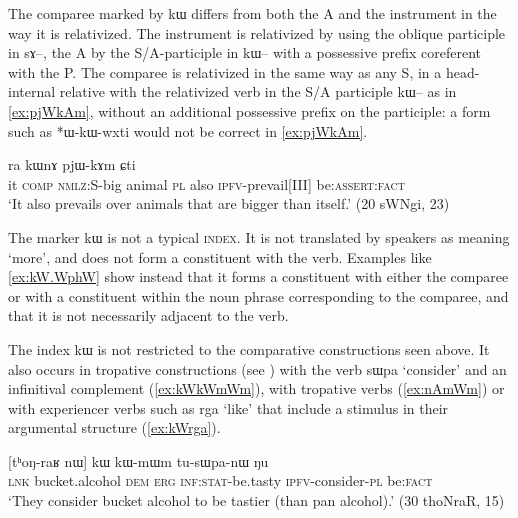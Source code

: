 \documentclass[oldfontcommands,oneside,a4paper,11pt]{article}
\newcommand{\ipa}[1]{{\phon #1}} %
\begin{document}
The comparee marked by \ipa{kɯ} differs from both the A and the instrument in the way it is relativized. The instrument is relativized by using the oblique participle in \ipa{sɤ--}, the A by the S/A-participle in \ipa{kɯ--} with a possessive prefix coreferent with the P. The comparee is relativized in the same way as any S, in a head-internal relative with the relativized verb in the S/A participle  \ipa{kɯ--} as in \ref{ex:pjWkAm}, without an additional possessive prefix on the participle: a form such as *\ipa{ɯ-kɯ-wxti} would not be correct in \ref{ex:pjWkAm}.

 
 
\begin{exe}
\ex \label{ex:pjWkAm}
\gll
[\ipa{ɯʑo}  	\ipa{sɤz}  	\ipa{kɯ-wxti}]  	\ipa{rɯdaʁ}  	\ipa{ra}  	\ipa{kɯnɤ}  	\ipa{pjɯ-kɤm}  	\ipa{ɕti}  \\
it \textsc{comp} \textsc{nmlz}:S-big animal \textsc{pl} also \textsc{ipfv}-prevail[III] be:\textsc{assert}:\textsc{fact} \\
\glt `It also prevails over animals that are bigger than itself.' (20 sWNgi, 23)
  \end{exe}

 
The marker   \ipa{kɯ} is not a typical  \textsc{index}. It is not translated by speakers as meaning `more', and does not form a constituent with the verb. Examples like \ref{ex:kW.WphW} show instead that it forms a constituent with either the comparee or with a constituent within the noun phrase corresponding to the comparee, and that it is not necessarily adjacent to the verb.

  
The index \ipa{kɯ} is not restricted to the comparative constructions seen above. It also occurs in  tropative constructions (see \citealt{jacques13tropative}) with the verb \ipa{sɯpa} `consider' and an infinitival complement (\ref{ex:kWkWmWm}), with   tropative verbs (\ref{ex:nAmWm}) or with experiencer verbs such as \ipa{rga} `like' that include  a stimulus in their argumental structure (\ref{ex:kWrga}).

\begin{exe}
\ex \label{ex:kWkWmWm}
\gll  \ipa{tɕe}   [\ipa{tʰoŋ-raʁ}   	\ipa{nɯ}]   	\ipa{kɯ}   	\ipa{kɯ-mɯm}   	\ipa{tu-sɯpa-nɯ}   	\ipa{ŋu}   \\
\textsc{lnk} bucket.alcohol \textsc{dem} \textsc{erg} \textsc{inf:stat}-be.tasty \textsc{ipfv}-consider-\textsc{pl} be:\textsc{fact} \\
\glt `They consider  bucket alcohol to be tastier (than pan alcohol).' (30 thoNraR, 15)
\end{exe}
\end{document}
